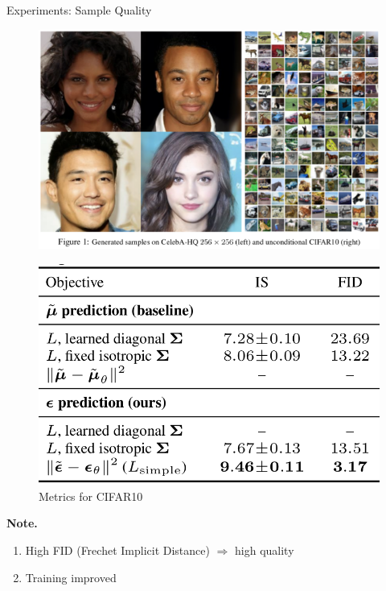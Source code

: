 \documentclass[aspectratio=169, 10pt]{beamer}
\theoremstyle{definition}
\begin{document}
\begin{frame}{Experiments: Sample Quality}
  \begin{minipage}[t]{0.6\textwidth}
    \begin{figure}[h!]
      \centering
      \includegraphics[width=\textwidth]{./pic/ho_celeb.png}
    \end{figure}
  \end{minipage}\hfill%
  \begin{minipage}[t]{0.35\textwidth}
    \begin{figure}[h]
      \centering
      \includegraphics[width=\textwidth]{./pic/ho_result.png}
      \caption{Metrics for CIFAR10}
    \end{figure}
    \textbf{Note.}
    \begin{enumerate}
      \item High FID (Frechet Implicit Distance) $\Rightarrow$ high quality 
      \item Training improved
    \end{enumerate}
  \end{minipage}

\end{frame}
\end{document}
